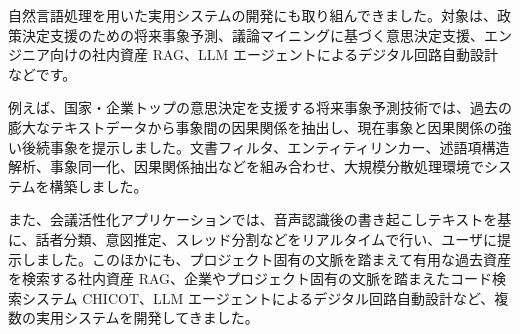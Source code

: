 自然言語処理を用いた実用システムの開発にも取り組んできました。対象は、政策決定支援のための将来事象予測、議論マイニングに基づく意思決定支援、エンジニア向けの社内資産 RAG、LLM エージェントによるデジタル回路自動設計などです。

例えば、国家・企業トップの意思決定を支援する将来事象予測技術では、過去の膨大なテキストデータから事象間の因果関係を抽出し、現在事象と因果関係の強い後続事象を提示しました。文書フィルタ、エンティティリンカー、述語項構造解析、事象同一化、因果関係抽出などを組み合わせ、大規模分散処理環境でシステムを構築しました。

また、会議活性化アプリケーションでは、音声認識後の書き起こしテキストを基に、話者分類、意図推定、スレッド分割などをリアルタイムで行い、ユーザに提示しました。このほかにも、プロジェクト固有の文脈を踏まえて有用な過去資産を検索する社内資産 RAG、企業やプロジェクト固有の文脈を踏まえたコード検索システム CHICOT、LLM エージェントによるデジタル回路自動設計など、複数の実用システムを開発してきました。
